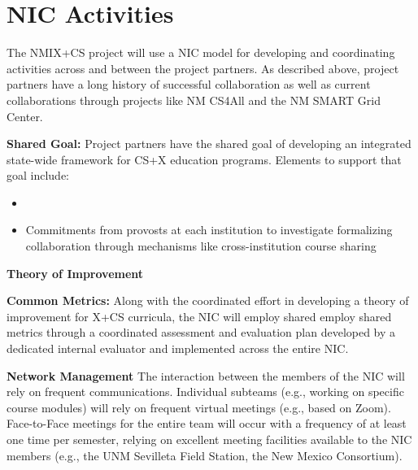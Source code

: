 \section{NIC Activities}
The NMIX+CS project will use a NIC model for developing and coordinating activities across and between the project partners. As described above, project partners have a long history of successful collaboration as well as current collaborations through projects like NM CS4All and the NM SMART Grid Center. 

\textbf{Shared Goal:} Project partners have the shared goal of developing an integrated state-wide framework for CS+X education programs. Elements to support that goal include:
\begin{itemize}
        \item 
        \item Commitments from provosts at each institution to investigate formalizing collaboration through mechanisms like cross-institution course sharing
\end{itemize}
\textbf{Theory of Improvement}

\textbf{Common Metrics:} Along with the coordinated effort in developing a theory of improvement for X+CS curricula, the NIC will employ shared employ shared metrics through a coordinated assessment and evaluation plan  developed by a dedicated internal evaluator and implemented across the entire NIC.

\textbf{Network Management}
The interaction between the members of the NIC will  rely on frequent communications. Individual subteams (e.g., working on specific course modules) will rely on frequent virtual meetings (e.g., based on Zoom). Face-to-Face meetings for the entire team will occur with a frequency of at least one time per semester, relying on excellent meeting facilities available to the NIC members (e.g., the UNM Sevilleta Field Station, the New Mexico Consortium).